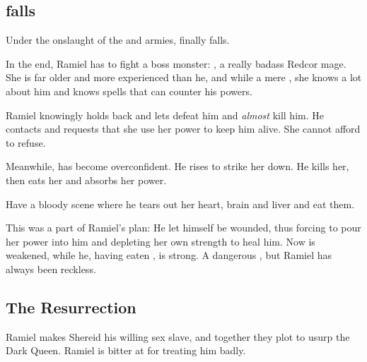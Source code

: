 \begin{garbage}
\subsection{\Redce{} falls}
Under the onslaught of the  and  armies,  finally falls. 

In the end, Ramiel has to fight a boss monster: 
\Matriarch{} \hs{\Dominice}, a really badass Redcor mage. 
She is far older and more experienced than he, and while a mere \human, she knows a lot about him and knows spells that can counter his \resphan{} powers. 

Ramiel knowingly holds back and lets \Dominice{} defeat him and \emph{almost} kill him. 
He contacts \Belzir{} and requests that she use her power to keep him alive. 
She cannot afford to refuse. 

Meanwhile, \Dominice{} has become overconfident. 
He rises to strike her down. 
He kills her, then eats her and absorbs her power. 

Have a bloody scene where he tears out her heart, brain and liver and eat them. 

This was a part of Ramiel's plan: 
He let himself be wounded, thus forcing \Belzir{} to pour her power into him and depleting her own strength to heal him. 
Now \Belzir{} is weakened, while he, having eaten \Dominice, is strong.
A dangerous , but Ramiel has always been reckless. 












\subsection{The Resurrection} 
Ramiel makes Shereid his willing sex slave, and together they plot to usurp the Dark Queen. 
Ramiel is bitter at \Belzir{} for treating him badly. 


\end{garbage}
